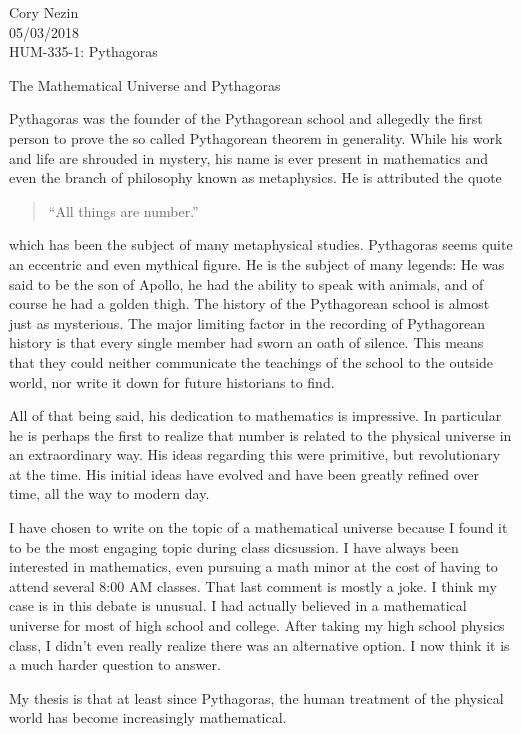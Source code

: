 \documentclass[12pt]{article}
\begin{document}
\doublespacing
\noindent
Cory Nezin\\
05/03/2018\\
HUM-335-1: Pythagoras
\begin{center}
\Large
The Mathematical Universe and Pythagoras
\end{center}

Pythagoras was the founder of the Pythagorean school and allegedly the first person to prove the so called Pythagorean theorem in generality.  While his work and life are shrouded in mystery, his name is ever present in mathematics and even the branch of philosophy known as metaphysics.  He is attributed the quote
\begin{quote}
\centering
``All things are number.''
\end{quote}
which has been the subject of many metaphysical studies.  Pythagoras seems quite an eccentric and even mythical figure.  He is the subject of many legends: He was said to be the son of Apollo, he had the ability to speak with animals, and of course he had a golden thigh.  The history of the Pythagorean school is almost just as mysterious.  The major limiting factor in the recording of Pythagorean history is that every single member had sworn an oath of silence.  This means that they could neither communicate the teachings of the school to the outside world, nor write it down for future historians to find.  

All of that being said, his dedication to mathematics is impressive.  In particular he is perhaps the first to realize that number is related to the physical universe in an extraordinary way.  His ideas regarding this were primitive, but revolutionary at the time.  His initial ideas have evolved and have been greatly refined over time, all the way to modern day.

I have chosen to write on the topic of a mathematical universe because I found it to be the most engaging topic during class dicsussion.  I have always been interested in mathematics, even pursuing a math minor at the cost of having to attend several 8:00 AM classes.  That last comment is mostly a joke.  I think my case is in this debate is unusual.  I had actually believed in a mathematical universe for most of high school and college.  After taking my high school physics class, I didn't even really realize there was an alternative option.  I now think it is a much harder question to answer.

My thesis is that at least since Pythagoras, the human treatment of the physical world has become increasingly mathematical.
\end{document}
